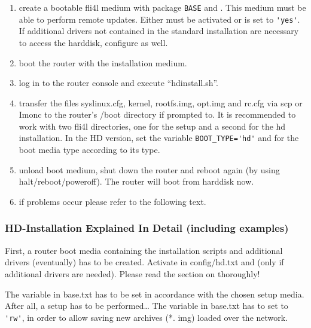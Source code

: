 \begin{enumerate}
    \item create a bootable fli4l medium with package \verb*?BASE? and . 
    This medium must be able to perform remote updates. Either 
    must be activated or  is set to \verb*?'yes'?. If additional 
    drivers not contained in the standard installation are necessary to access the 
    harddisk, configure  as well.
    \item boot the router with the installation medium.
    \item log in to the router console and execute ``hdinstall.sh''.
    \item transfer the files syslinux.cfg, kernel, rootfs.img, opt.img and rc.cfg 
    via scp or Imonc to the router's /boot directory if prompted to. It is recommended to 
    work with two fli4l directories, one for the setup and a second for the hd 
    installation. In the HD version, set the variable \verb*?BOOT_TYPE='hd'? 
    and for the boot media type according to its type.
    
    \item unload boot medium, shut down the router and reboot again (by using 
    halt/reboot/poweroff). The router will boot from harddisk now.
    \item if problems occur please refer to the following text.
\end{enumerate}


    \subsubsection{HD-Installation Explained In Detail (including examples)}

    First, a router boot media containing the installation scripts and additional 
    drivers (eventually) has to be created. Activate  in
    config/hd.txt and  (only if additional drivers are needed).
    Please read the section on  thoroughly!
    
    The variable  in base.txt has to be set in accordance with the 
    chosen setup media. After all, a setup has to be performed\dots
    The variable  in base.txt has to set to \verb*?'rw'?,
    in order to allow saving new archives (*. img) loaded over the network.
    
